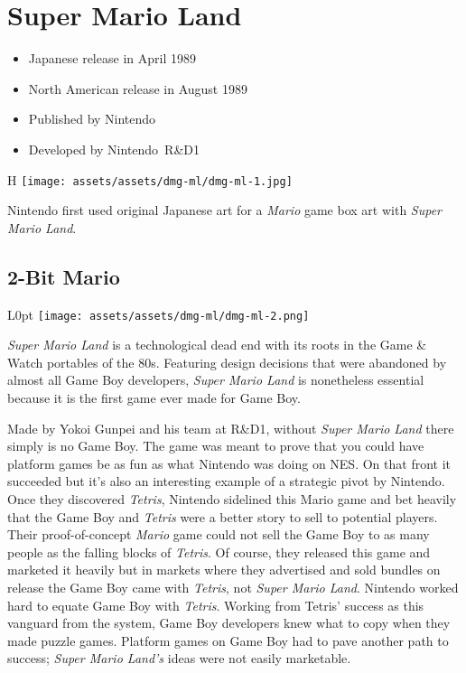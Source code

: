 \documentclass{book}
\begin{document}
\begingroup \chapter*{Super Mario Land} \endgroup

\begin{itemize} \setlength\itemsep{-0.4em}
\item Japanese release in April 1989
\item North American release in August 1989
\item Published by Nintendo
\item Developed by Nintendo R\&D1
\end{itemize}\noindent

\begin{wrapfigure}{H}{\linewidth}
\vskip 4pt
\centering \texttt{[image: assets/assets/dmg-ml/dmg-ml-1.jpg]}\par\pagetwodescription Nintendo first used original Japanese art for a \emph{Mario} game box art with \emph{Super Mario Land}.\end{wrapfigure}
\clearpage

\FloatBarrier\needspace{5pt}\section*{2-Bit Mario}\nopagebreak[4]

\begin{wrapfigure}{L}{0pt} \texttt{[image: assets/assets/dmg-ml/dmg-ml-2.png]}\end{wrapfigure}
\emph{Super Mario Land} is a technological dead end with its roots in the Game \& Watch portables of the 80s. Featuring design decisions that were abandoned by almost all Game Boy developers, \emph{Super Mario Land} is nonetheless essential because it is the first game ever made for Game Boy.

Made by Yokoi Gunpei and his team at R\&D1, without \emph{Super Mario Land} there simply is no Game Boy. The game was meant to prove that you could have platform games be as fun as what Nintendo was doing on NES. On that front it succeeded but it’s also an interesting example of a strategic pivot by Nintendo. Once they discovered \emph{Tetris}, Nintendo sidelined this Mario game and bet heavily that the Game Boy and \emph{Tetris} were a better story to sell to potential players. Their proof-of-concept \emph{Mario} game could not sell the Game Boy to as many people as the falling blocks of \emph{Tetris}. Of course, they released this game and marketed it heavily but in markets where they advertised and sold bundles on release the Game Boy came with \emph{Tetris}, not \emph{Super Mario Land}. Nintendo worked hard to equate Game Boy with \emph{Tetris}. Working from Tetris’ success as this vanguard from the system, Game Boy developers knew what to copy when they made puzzle games. Platform games on Game Boy had to pave another path to success; \emph{Super Mario Land’s} ideas were not easily marketable.
\end{document}
